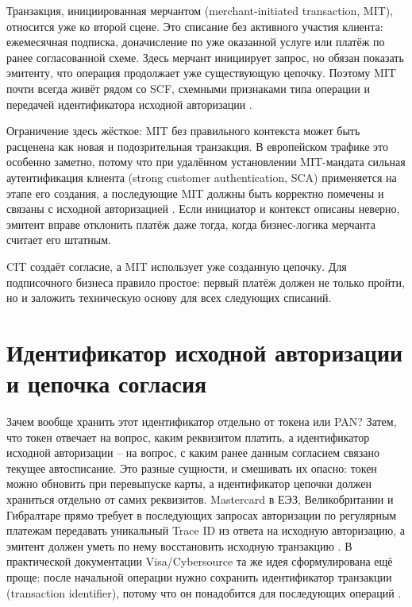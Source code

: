 Транзакция, инициированная мерчантом (merchant-initiated transaction,
MIT), относится уже ко второй сцене. Это списание без активного участия
клиента: ежемесячная подписка, доначисление по уже оказанной услуге или
платёж по ранее согласованной схеме. Здесь мерчант инициирует запрос,
но обязан показать эмитенту, что операция продолжает уже существующую
цепочку. Поэтому MIT почти всегда живёт рядом со SCF, схемными
признаками типа операции и передачей идентификатора исходной
авторизации \cite{mc-tpr}\cite{cybs-mc-subscription-mit}.

Ограничение здесь жёсткое: MIT без правильного контекста может быть
расценена как новая и подозрительная транзакция. В европейском трафике
это особенно заметно, потому что при удалённом установлении MIT-мандата
сильная аутентификация клиента (strong customer authentication, SCA)
применяется на этапе его создания, а
последующие MIT должны быть корректно помечены и связаны с исходной
авторизацией \cite{eba-mit-qa}\cite{mc-tpr}. Если инициатор и
контекст описаны неверно, эмитент вправе отклонить платёж даже тогда,
когда бизнес-логика мерчанта считает его штатным.

CIT создаёт согласие, а MIT использует уже созданную цепочку.
Для подписочного бизнеса правило простое: первый платёж
должен не только пройти, но и заложить техническую основу для всех
следующих списаний.

\section{Идентификатор исходной авторизации и цепочка согласия}
\label{sec:subscriptions-ntid}

Зачем вообще хранить этот идентификатор отдельно от токена или PAN?
Затем, что токен отвечает на вопрос, каким реквизитом платить, а
идентификатор исходной авторизации -- на вопрос, с каким ранее данным
согласием связано текущее автосписание. Это разные
сущности, и смешивать их опасно: токен можно обновить при перевыпуске
карты, а идентификатор цепочки должен храниться отдельно от самих
реквизитов. Mastercard в ЕЭЗ, Великобритании и Гибралтаре прямо требует
в последующих запросах авторизации по регулярным платежам передавать
уникальный Trace ID из ответа на исходную авторизацию, а эмитент должен
уметь по нему восстановить исходную транзакцию \cite{mc-tpr}. В
практической документации Visa/Cybersource та же идея сформулирована
ещё проще: после начальной операции нужно сохранить идентификатор
транзакции (transaction identifier), потому что он понадобится для
последующих операций
\cite{cybs-initial-transactions}.

